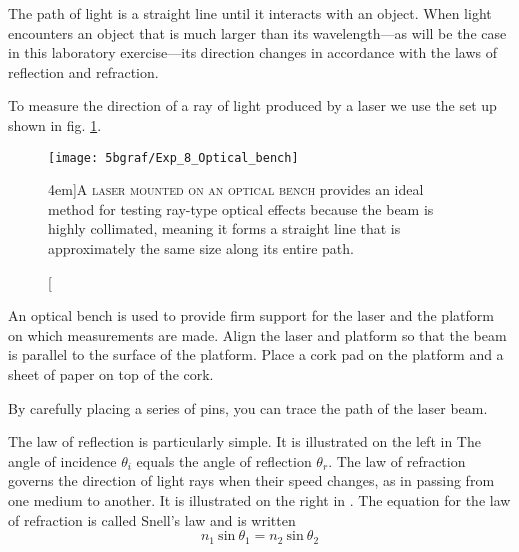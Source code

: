 
The path of light is a straight line until it interacts with an object.  When light encounters an object that is much larger than its wavelength---as will be the case in this laboratory exercise---its direction changes in accordance with the laws of reflection and refraction.
 
To measure the direction of a ray of light produced by a laser we use the set up shown in fig. \ref{f:fig14}.

\begin{figure}
	\centering
	\texttt{[image: 5bgraf/Exp\_8\_Optical\_bench]}
	\caption[Laser on an Optical Bench][4em]{\textsc{A laser mounted on an optical bench} provides an ideal method for testing ray-type optical effects because the beam is highly collimated, meaning it forms a straight line that is approximately the same size along its entire path.}
	\label{f:fig14}
	\forceversofloat
\end{figure}

An optical bench is used to provide firm support for the laser and the platform on which measurements are made.  Align the laser and platform so that the beam is parallel to the surface of the platform.  Place a cork pad on the platform and a sheet of paper on top of the cork.  

By carefully placing a series of pins, you can trace the path of the laser beam.

The law of reflection is particularly simple.  It is illustrated on the left in   The angle of incidence $\theta_i$ equals the angle of reflection $\theta_r$.  The law of refraction governs the direction of light rays when their speed changes, as in passing from one medium to another.  It is illustrated on the right in .  The equation for the law of refraction is called Snell's law and is written
\begin {equation} \label{e:snell}
n_1 \ \text{sin} \ \theta_1 = n_2 \ \text{sin} \ \theta_2
\end {equation}

